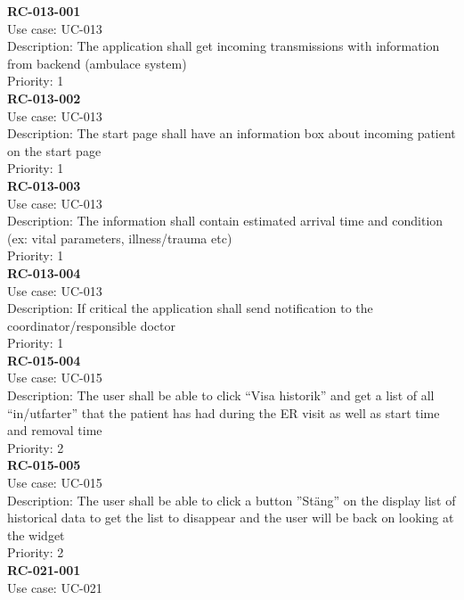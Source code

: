 \newline
\newline
\textbf{RC-013-001} \\
Use case: UC-013 \\
Description: The application shall get incoming transmissions with information from backend (ambulace system) \\
Priority: 1 \\
\newline
\textbf{RC-013-002} \\
Use case: UC-013 \\
Description: The start page shall have an information box about incoming patient on the start page \\
Priority: 1 \\
\newline
\textbf{RC-013-003} \\
Use case: UC-013 \\
Description: The information shall contain estimated arrival time and condition (ex: vital parameters, illness/trauma etc) \\
Priority: 1 \\
\newline
\textbf{RC-013-004} \\
Use case: UC-013 \\
Description: If critical the application shall send notification to the coordinator/responsible doctor \\
Priority: 1 \\
\newline
\textbf{RC-015-004} \\
Use case: UC-015 \\
Description: The user shall be able to click “Visa historik” and get a list of all “in/utfarter” that the patient has had during the ER visit as well as start time and removal time \\
Priority: 2 \\
\newline
\textbf{RC-015-005} \\
Use case: UC-015 \\
Description: The user shall be able to click a button ”Stäng” on the display list of historical data to get the list to disappear and the user will be back on looking at the widget \\
Priority: 2 \\
\newline
\textbf{RC-021-001} \\
Use case: UC-021 \\
